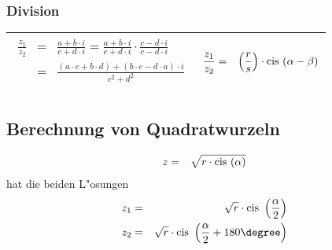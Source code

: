 \documentclass[a4paper]{article}
\begin{document}
\subsubsection{Division}
\begin{tabular}{| p{} |  p{} |}
\hline
\begin{minipage}[t]{0.5\textwidth}
    \begin{eqnarray*}
    \frac{z_1}{z_2} &=& \frac{a+b \cdot i}{c + d \cdot i} = \frac{a+b\cdot i}{c+d\cdot i} \cdot \frac{c-d\cdot i}{c-d\cdot i}\\
     &=& \frac{(a \cdot c + b \cdot d) + (b \cdot c - d \cdot a) \cdot i}{c^2 + d^2}\\
    \end{eqnarray*}
\end{minipage}
&
\begin{minipage}[t]{0.5\textwidth}
    \begin{eqnarray*}
    \frac{z_1}{z_2} &=& \left( \frac{r}{s} \right) \cdot \text{cis } (\alpha - \beta)\\
    \end{eqnarray*}
\end{minipage}\\
\hline
\end{tabular}

\subsection{Berechnung von Quadratwurzeln}
\begin{eqnarray*}
z &=& \sqrt{r \cdot \text{cis }(\alpha)}
\end{eqnarray*}
hat die beiden L"osungen
\begin{eqnarray*}
z_1 &=& \sqrt{r} \cdot \cis\left( \frac{\alpha}{2} \right)\\
z_2 &=& \sqrt{r} \cdot \cis\left( \frac{\alpha}{2} + 180\degree \right)
\end{eqnarray*}
\end{document}
